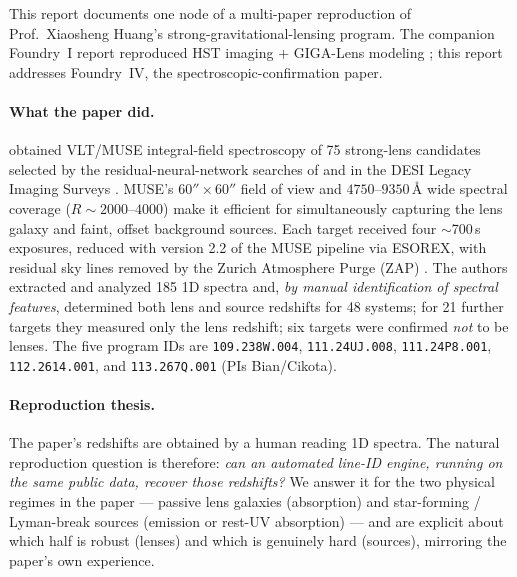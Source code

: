 \documentclass[11pt,letterpaper]{article}
\newcommand{\muse}{\textsc{MUSE}}
\newcommand{\zap}{\textsc{ZAP}}
\begin{document}
This report documents one node of a multi-paper reproduction of
Prof.\ Xiaosheng Huang's strong-gravitational-lensing program. The companion
Foundry~I report reproduced HST imaging + GIGA-Lens modeling
\autocite{huang2025foundry1}; this report addresses Foundry~IV, the
spectroscopic-confirmation paper.

\paragraph{What the paper did.}
\citet{lin2025foundry4} obtained VLT/\muse{} \autocite{bacon2010muse}
integral-field spectroscopy of 75 strong-lens candidates selected by the
residual-neural-network searches of \citet{huang2020decals,huang2021decals2}
and \citet{storfer2024} in the DESI Legacy Imaging Surveys
\autocite{desilegacy2019}. \muse{}'s $60'' \times 60''$ field of view and
$4750$--$9350$\,\AA{} wide spectral coverage ($R \sim 2000$--$4000$) make it
efficient for simultaneously capturing the lens galaxy and faint, offset
background sources. Each target received four $\sim$700\,s exposures, reduced
with version 2.2 of the \muse{} pipeline \autocite{weilbacher2020muse} via
\textsc{ESOREX}, with residual sky lines removed by the Zurich Atmosphere Purge
(\zap{}) \autocite{soto2016zap}. The authors extracted and analyzed 185 1D
spectra and, \emph{by manual identification of spectral features}, determined
both lens and source redshifts for 48 systems; for 21 further targets they
measured only the lens redshift; six targets were confirmed \emph{not} to be
lenses. The five program IDs are \texttt{109.238W.004},
\texttt{111.24UJ.008}, \texttt{111.24P8.001}, \texttt{112.2614.001}, and
\texttt{113.267Q.001} (PIs Bian/Cikota).

\paragraph{Reproduction thesis.}
The paper's redshifts are obtained by a human reading 1D spectra. The natural
reproduction question is therefore: \emph{can an automated line-ID engine,
running on the same public data, recover those redshifts?} We answer it for the
two physical regimes in the paper --- passive lens galaxies (absorption) and
star-forming / Lyman-break sources (emission or rest-UV absorption) --- and are
explicit about which half is robust (lenses) and which is genuinely hard
(sources), mirroring the paper's own experience.
\end{document}
